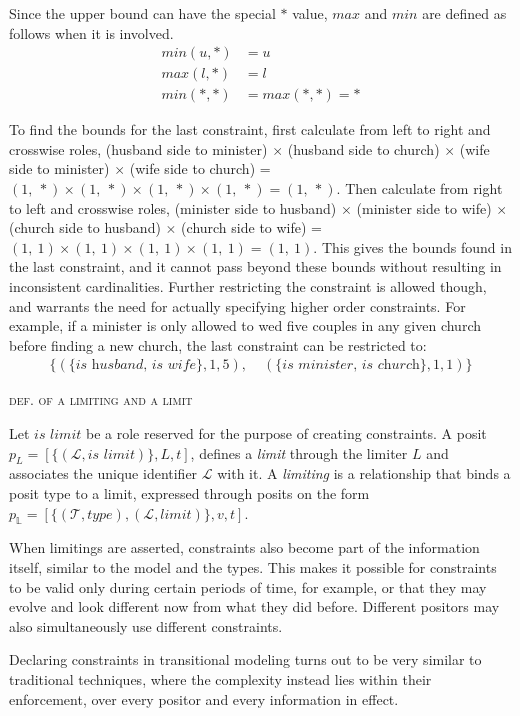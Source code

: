 \documentclass[sfsidenotes,nobib,twoside,symmetric]{tufte-handout}
\newcounter{majorcount}
\newcommand{\deffy}[3]{
	\vspace{2ex}
	\refstepcounter{majorcount} 
	\noindent\textsc{#1}%
	\\\begin{small}
	\noindent #2%
	\label{Def:#3}
	\end{small}
	\vspace{2ex}
}
\begin{document}
Since the upper bound can have the special $*$ value, $max$ and $min$ are defined as follows when it is involved.
\begin{align*}
min(u, *) &= u \\
max(l, *) &= l \\
min(*, *) &= max(*, *) = * 
\end{align*}

To find the bounds for the last constraint, first calculate from left to right and crosswise roles, (husband side to minister) $\times$ (husband side to church) $\times$ (wife side to minister) $\times$ (wife side to church) = $(1,~*) \times (1,~*) \times (1,~*) \times (1,~*) = (1,~*)$. Then calculate from right to left and crosswise roles, (minister side to husband) $\times$ (minister side to wife) $\times$ (church side to husband) $\times$ (church side to wife) = $(1,~1) \times (1,~1) \times (1,~1) \times (1,~1) = (1,~1)$. This gives the bounds found in the last constraint, and it cannot pass beyond these bounds without resulting in inconsistent cardinalities. Further restricting the constraint is allowed though, and warrants the need for actually specifying higher order constraints. For example, if a minister is only allowed to wed five couples in any given church before finding a new church, the last constraint can be restricted to:
\begin{align*}
\{(\{\textit{is husband, is wife}\}, 1, 5),\;& (\{\textit{is minister, is church}\}, 1, 1)\}
\end{align*}

\pagebreak\deffy{def. of a limiting and a limit}{%
Let $\textit{is limit}$ be a role reserved for the purpose of creating constraints. A posit $p_{L} = [\{(\mathcal{L}, \textit{is limit})\}, L, t]$, defines a \emph{limit} through the limiter $L$ and associates the unique identifier $\mathcal{L}$ with it. A \emph{limiting} is a relationship that binds a posit type to a limit, expressed through posits on the form $p_{\mathbb{L}} = [\{(\mathcal{T}, \textit{type}), (\mathcal{L}, \textit{limit})\}, v, t]$.
}{limiting}

When limitings are asserted, constraints also become part of the information itself, similar to the model and the types. This makes it possible for constraints to be valid only during certain periods of time, for example, or that they may evolve and look different now from what they did before. Different positors may also simultaneously use different constraints. 

Declaring constraints in transitional modeling turns out to be very similar to traditional techniques, where the complexity instead lies within their enforcement, over every positor and every information in effect. 
\end{document}

